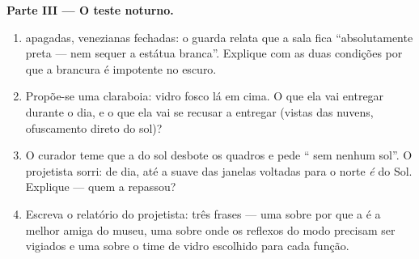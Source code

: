 \begin{problem}
\medskip\noindent\textbf{Parte III --- O teste noturno.}
\begin{enumerate}[resume]
  \item {} apagadas, venezianas fechadas: o guarda relata que a
        sala fica ``absolutamente preta --- nem sequer a estátua
        branca''. Explique com as duas condições por que a brancura é
        impotente no escuro.
  \item Propõe-se uma claraboia: vidro fosco lá em cima. O que ela
        vai entregar durante o dia, e o que ela vai se recusar a
        entregar (vistas das nuvens, ofuscamento direto do sol)?
  \item O curador teme que a  do sol desbote os quadros e pede
        `` sem nenhum sol''. O projetista sorri: de dia, até a 
        suave das janelas voltadas para o norte \emph{é}  do Sol.
        Explique --- quem a repassou?
  \item Escreva o relatório do projetista: três frases --- uma sobre
        por que a  é a melhor amiga do museu, uma sobre onde
        os reflexos do modo  precisam ser vigiados e uma sobre
        o time de vidro escolhido para cada função.
\end{enumerate}
\end{problem}
